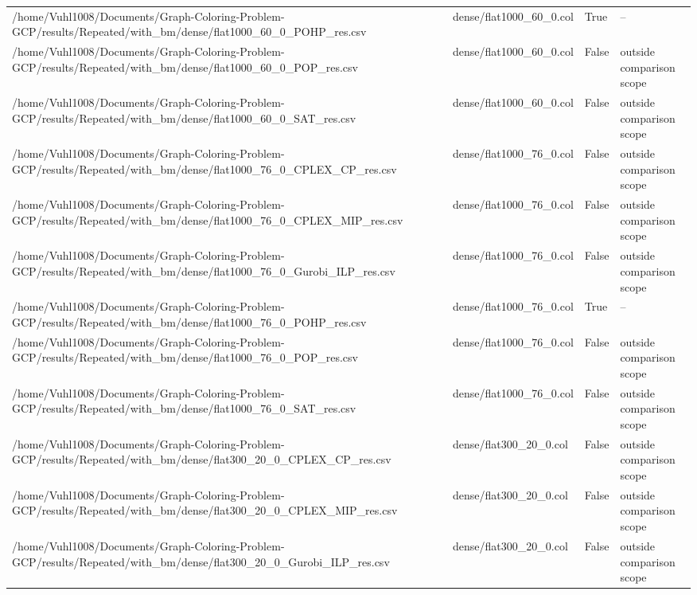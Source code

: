 \begin{table}[htbp]
\begin{tabular}{llll}
/home/Vuhl1008/Documents/Graph-Coloring-Problem-GCP/results/Repeated/with\_bm/dense/flat1000\_60\_0\_POHP\_res.csv & dense/flat1000\_60\_0.col & True & -- \\
/home/Vuhl1008/Documents/Graph-Coloring-Problem-GCP/results/Repeated/with\_bm/dense/flat1000\_60\_0\_POP\_res.csv & dense/flat1000\_60\_0.col & False & outside comparison scope \\
/home/Vuhl1008/Documents/Graph-Coloring-Problem-GCP/results/Repeated/with\_bm/dense/flat1000\_60\_0\_SAT\_res.csv & dense/flat1000\_60\_0.col & False & outside comparison scope \\
/home/Vuhl1008/Documents/Graph-Coloring-Problem-GCP/results/Repeated/with\_bm/dense/flat1000\_76\_0\_CPLEX\_CP\_res.csv & dense/flat1000\_76\_0.col & False & outside comparison scope \\
/home/Vuhl1008/Documents/Graph-Coloring-Problem-GCP/results/Repeated/with\_bm/dense/flat1000\_76\_0\_CPLEX\_MIP\_res.csv & dense/flat1000\_76\_0.col & False & outside comparison scope \\
/home/Vuhl1008/Documents/Graph-Coloring-Problem-GCP/results/Repeated/with\_bm/dense/flat1000\_76\_0\_Gurobi\_ILP\_res.csv & dense/flat1000\_76\_0.col & False & outside comparison scope \\
/home/Vuhl1008/Documents/Graph-Coloring-Problem-GCP/results/Repeated/with\_bm/dense/flat1000\_76\_0\_POHP\_res.csv & dense/flat1000\_76\_0.col & True & -- \\
/home/Vuhl1008/Documents/Graph-Coloring-Problem-GCP/results/Repeated/with\_bm/dense/flat1000\_76\_0\_POP\_res.csv & dense/flat1000\_76\_0.col & False & outside comparison scope \\
/home/Vuhl1008/Documents/Graph-Coloring-Problem-GCP/results/Repeated/with\_bm/dense/flat1000\_76\_0\_SAT\_res.csv & dense/flat1000\_76\_0.col & False & outside comparison scope \\
/home/Vuhl1008/Documents/Graph-Coloring-Problem-GCP/results/Repeated/with\_bm/dense/flat300\_20\_0\_CPLEX\_CP\_res.csv & dense/flat300\_20\_0.col & False & outside comparison scope \\
/home/Vuhl1008/Documents/Graph-Coloring-Problem-GCP/results/Repeated/with\_bm/dense/flat300\_20\_0\_CPLEX\_MIP\_res.csv & dense/flat300\_20\_0.col & False & outside comparison scope \\
/home/Vuhl1008/Documents/Graph-Coloring-Problem-GCP/results/Repeated/with\_bm/dense/flat300\_20\_0\_Gurobi\_ILP\_res.csv & dense/flat300\_20\_0.col & False & outside comparison scope \\

\end{tabular}
\end{table}
